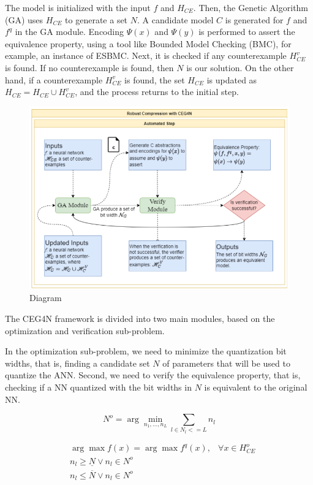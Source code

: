 \documentclass[conference]{IEEEtran}
\begin{document}
The model is initialized with the input \( f \) and \( H_{CE} \). Then, the Genetic Algorithm (GA) uses \( H_{CE} \) to generate a set \( N \). A candidate model \( C \) is generated for \( f \) and \( f^q \) in the GA module. Encoding \( \Psi(x) \) and \( \Psi(y) \) is performed to assert the equivalence property, using a tool like Bounded Model Checking (BMC), for example, an instance of ESBMC. Next, it is checked if any counterexample \( H^v_{CE} \) is found. If no counterexample is found, then \( N \) is our solution. On the other hand, if a counterexample \( H^v_{CE} \) is found, the set \( H_{CE} \) is updated as \( H_{CE} = H_{CE} \cup H^v_{CE} \), and the process returns to the initial step.

\begin{figure}[h]
  \centering

    \centering
    \includegraphics[width=0.8\linewidth]{framework.png} %
    \caption{Diagram}
    \label{fig:image1}
  
\end{figure}

The CEG4N framework is divided into two main modules, based on the optimization and verification sub-problem. 

In the optimization sub-problem, we need to minimize the quantization bit widths, that is, finding a candidate set $N$ of parameters that will be used to quantize the ANN. Second, we need to verify the equivalence property, that is, checking if a NN quantized with the bit widths in $N$ is equivalent to the original NN. 

\begin{equation}
    N^o = \arg\min_{n_1,...,n_L} \sum_{l \in N_l <= L} n_l 
\end{equation}
    
$$
\begin{aligned}
& \arg\max f(x) = \arg\max f^q(x), & \forall x \in H^o_{CE} \\
& n_l \geq \underline{N} \vee n_l  \in N^o \\
& n_l  \leq \overline{N}  \vee n_l  \in N^o 
\end{aligned}
$$
\end{document}

